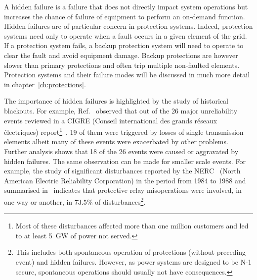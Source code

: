 A hidden failure is a failure that does not directly impact system operations but increases the chance of failure of equipment to perform an on-demand function. Hidden failures are of particular concern in protection systems. Indeed, protection systems need only to operate when a fault occurs in a given element of the grid. If a protection system fails, a backup protection system will need to operate to clear the fault and avoid equipment damage. Backup protections are however slower than primary protections and often trip multiple non-faulted elements. Protection systems and their failure modes will be discussed in much more detail in chapter~\ref{ch:protections}.


The importance of hidden failures is highlighted by the study of historical blackouts. For example, Ref.~\cite{CascadingMethodoAndChallenges} observed that out of the 26 major unreliability events reviewed in a CIGRE (Conseil international des grands réseaux électriques) report\footnote{Most of these disturbances affected more than one million customers and led to at least 5~GW of power not served.}~\cite{majorBlackouts}, 19 of them were triggered by losses of single transmission elements albeit many of these events were exacerbated by other problems. Further analysis shows that 18 of the 26 events were caused or aggravated by hidden failures. The same observation can be made for smaller scale events. For example, the study of significant disturbances reported by the NERC~\cite{NERCDisturbancesReport} (North American Electric Reliability Corporation) in the period from 1984 to 1988 and summarised in~\cite{ZoneVulnerability} indicates that protective relay misoperations were involved, in one way or another, in 73.5\% of disturbances\footnote{This includes both spontaneous operation of protections (without preceding event) and hidden failures. However, as power systems are designed to be N-1 secure, spontaneous operations should usually not have consequences.}.


